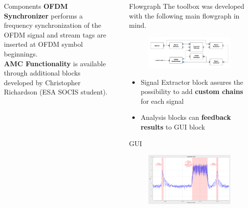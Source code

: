 \documentclass{beamer}
\begin{document}
\begin{frame}
\begin{columns}[t]
\begin{column}{0.33\textwidth}
\begin{block}{Components}
\textbf{OFDM Synchronizer}
performs a frequency synchronization of the OFDM signal and stream tags are inserted at OFDM symbol beginnings.\\[0.5em]

\textbf{AMC Functionality}
is available through additional blocks developed by Christopher Richardson (ESA SOCIS student).

\vspace{1.5em}
      \end{block}
    \end{column}
    \begin{column}{0.01\textwidth}
    \end{column}
    \begin{column}{0.66\textwidth}
      \begin{block}{Flowgraph}
        The toolbox was developed with the following main flowgraph in mind.
        \begin{figure}
          \includegraphics[width=\textwidth]{figures/flowgraph}
        \end{figure}
        \begin{itemize}
          \item Signal Extractor block assures the possibility to add \textbf{custom chains} for each signal 
          \item Analysis blocks can \textbf{feedback results} to GUI block
        \end{itemize}
      \end{block}
      \begin{block}{GUI}
      \begin{figure}
        \includegraphics[width=\textwidth]{figures/gui.png}

\end{figure}
\end{block}
\end{column}
\end{columns}
\end{frame}
\end{document}
